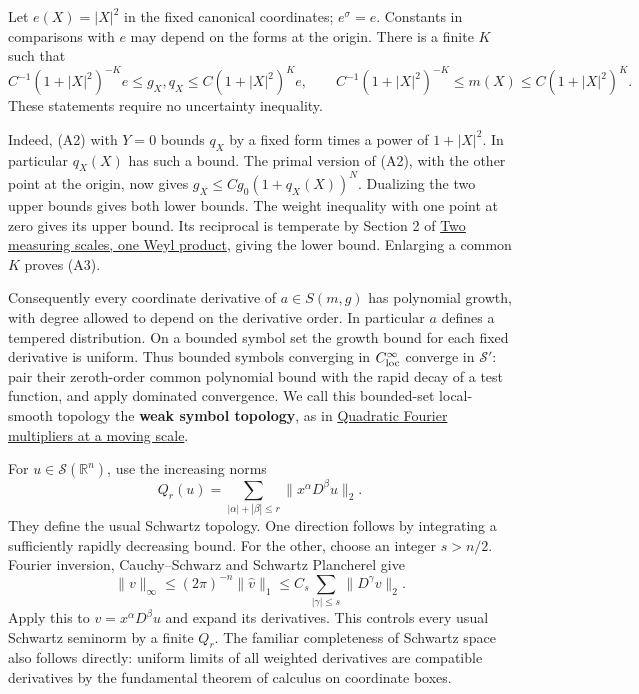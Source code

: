 \documentclass[
  11pt,
]{article}
\begin{document}
Let \(e(X)=|X|^2\) in the fixed canonical coordinates; \(e^\sigma=e\).
Constants in comparisons with \(e\) may depend on the forms at the
origin. There is a finite \(K\) such that \[
C^{-1}(1+|X|^2)^{-K}e
\le g_X,q_X\le C(1+|X|^2)^K e,
\qquad
C^{-1}(1+|X|^2)^{-K}\le m(X)\le C(1+|X|^2)^K.
\tag{A3}
\] These statements require no uncertainty inequality.

Indeed, (A2) with \(Y=0\) bounds \(q_X\) by a fixed form times a power
of \(1+|X|^2\). In particular \(q_X(X)\) has such a bound. The primal
version of (A2), with the other point at the origin, now gives
\(g_X\le Cg_0(1+q_X(X))^N\). Dualizing the two upper bounds gives both
lower bounds. The weight inequality with one point at zero gives its
upper bound. Its reciprocal is temperate by Section 2 of
\href{weyl-metric-products.pdf}{Two measuring scales, one Weyl product},
giving the lower bound. Enlarging a common \(K\) proves (A3).

Consequently every coordinate derivative of \(a\in S(m,g)\) has
polynomial growth, with degree allowed to depend on the derivative
order. In particular \(a\) defines a tempered distribution. On a bounded
symbol set the growth bound for each fixed derivative is uniform. Thus
bounded symbols converging in \(C^\infty_{\rm loc}\) converge in
\(\mathcal S'\): pair their zeroth-order common polynomial bound with
the rapid decay of a test function, and apply dominated convergence. We
call this bounded-set local-smooth topology the \textbf{weak symbol
topology}, as in \href{gauss-transform-estimates.pdf}{Quadratic Fourier
multipliers at a moving scale}.

For \(u\in\mathcal S(\mathbb R^n)\), use the increasing norms \[
Q_r(u)=\sum_{|\alpha|+|\beta|\le r}\|x^\alpha D^\beta u\|_2.
\tag{A4}
\] They define the usual Schwartz topology. One direction follows by
integrating a sufficiently rapidly decreasing bound. For the other,
choose an integer \(s>n/2\). Fourier inversion, Cauchy--Schwarz and
Schwartz Plancherel give \[
\|v\|_\infty\le (2\pi)^{-n}\|\widehat v\|_1
\le C_s\sum_{|\gamma|\le s}\|D^\gamma v\|_2.
\tag{A5}
\] Apply this to \(v=x^\alpha D^\beta u\) and expand its derivatives.
This controls every usual Schwartz seminorm by a finite \(Q_r\). The
familiar completeness of Schwartz space also follows directly: uniform
limits of all weighted derivatives are compatible derivatives by the
fundamental theorem of calculus on coordinate boxes.
\end{document}

